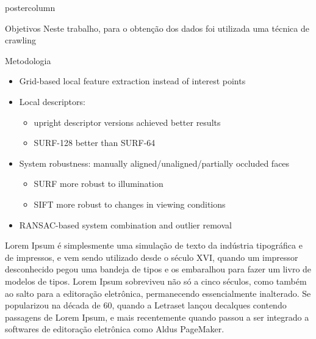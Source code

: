\documentclass[final,hyperref={pdfpagelabels=false}]{beamer}
\begin{document}
\begin{frame}
\begin{columns}
\begin{column}{.49\textwidth}
\begin{beamercolorbox}[center,wd=\textwidth]{postercolumn}
\begin{minipage}[T]{.95\textwidth}
{\begin{block}{Objetivos}
Neste trabalho, para o obtenção dos dados foi utilizada uma técnica de crawling 
		
            \end{block}
        	\vfill    
            \begin{block}{Metodologia}
              \begin{itemize}
              \item Grid-based local feature extraction instead of interest points
              \item Local descriptors:
                \begin{itemize}
                \item upright descriptor versions achieved better results
                \item SURF-128 better than SURF-64
                \end{itemize}
              \item System robustness: manually aligned/unaligned/partially occluded faces
                \begin{itemize}
                \item SURF more robust to illumination
                \item SIFT more robust to changes in viewing conditions
                \end{itemize}
              \item RANSAC-based system combination and outlier removal
              \end{itemize}
              Lorem Ipsum é simplesmente uma simulação de texto da indústria tipográfica e de impressos, e vem sendo utilizado desde o século XVI, quando um impressor desconhecido pegou uma bandeja de tipos e os embaralhou para fazer um livro de modelos de tipos. Lorem Ipsum sobreviveu não só a cinco séculos, como também ao salto para a editoração eletrônica, permanecendo essencialmente inalterado. Se popularizou na década de 60, quando a Letraset lançou decalques contendo passagens de Lorem Ipsum, e mais recentemente quando passou a ser integrado a softwares de editoração eletrônica como Aldus PageMaker.
            \end{block}
            \vfill
          }
        \end{minipage}
      \end{beamercolorbox}
    \end{column}


\end{columns}
\end{frame}
\end{document}
